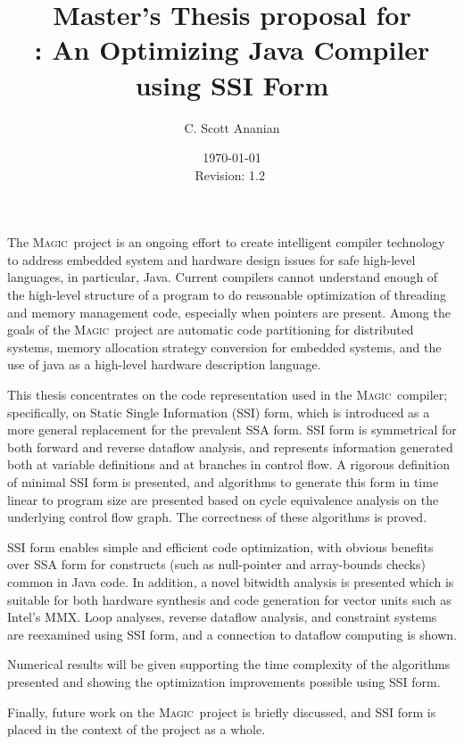 \documentclass[12pt,notitlepage,twocolumn,twoside]{article}
\title{{\large Master's Thesis proposal for}\\
\magic: An Optimizing Java Compiler using SSI Form}
\author{C. Scott Ananian}
\date{\today \\ $ $Revision: 1.2 $ $}
\newcommand{\magic}{\textsc{Magic}}
\begin{document}
\pagestyle{myheadings}

\maketitle

The \magic\ project is an ongoing effort to create intelligent
compiler technology to address embedded system and hardware design
issues for safe high-level languages, in particular, Java.
Current compilers cannot understand enough of the high-level structure
of a program to do reasonable optimization of threading and memory
management code, especially when pointers are present. Among the goals
of the \magic\ project are automatic code partitioning for distributed
systems, memory allocation strategy conversion for embedded systems,
and the use of java as a high-level hardware description language.

This thesis concentrates on the code representation used in the
\magic\ compiler; specifically, on Static Single Information (SSI)
form, which is introduced as a more general replacement for the
prevalent SSA form.  SSI form is symmetrical for both forward and
reverse dataflow analysis, and represents information generated both
at variable definitions and at branches in control flow.  A rigorous
definition of minimal SSI form is presented, and algorithms to
generate this form in time linear to program size are
presented based on cycle equivalence analysis on the underlying
control flow graph.  The correctness of these algorithms is proved.

SSI form enables simple and efficient code optimization, with obvious
benefits over SSA form for constructs (such as null-pointer and
array-bounds checks) common in Java code.  In addition, a novel
bitwidth analysis is presented which is suitable for both hardware
synthesis and code generation for vector units such as Intel's MMX.
Loop analyses, reverse dataflow analysis, and constraint systems are
reexamined using SSI form, and a connection to dataflow computing is
shown.

Numerical results will be given supporting the time complexity of the
algorithms presented and showing the optimization improvements
possible using SSI form.

Finally, future work on the \magic\ project is briefly discussed, and
SSI form is placed in the context of the project as a whole.
\end{document}
